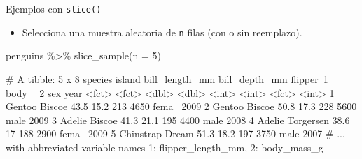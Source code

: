 \documentclass[
  ignorenonframetext,
  aspectratio=169]{beamer}
\newenvironment{Shaded}{\begin{snugshade}}{\end{snugshade}}
\newcommand{\AttributeTok}[1]{\textcolor[rgb]{0.77,0.63,0.00}{#1}}
\newcommand{\DecValTok}[1]{\textcolor[rgb]{0.00,0.00,0.81}{#1}}
\newcommand{\FunctionTok}[1]{\textcolor[rgb]{0.00,0.00,0.00}{#1}}
\newcommand{\NormalTok}[1]{#1}
\newcommand{\SpecialCharTok}[1]{\textcolor[rgb]{0.00,0.00,0.00}{#1}}
\providecommand{\tightlist}{%
  \setlength{\itemsep}{0pt}\setlength{\parskip}{0pt}}
\let\oldverbatim\verbatim
\let\endoldverbatim\endverbatim
\renewenvironment{verbatim}{\tiny\oldverbatim}{\endoldverbatim}
\begin{document}
\begin{frame}[fragile]{Ejemplos con \texttt{slice()}}
\protect\hypertarget{ejemplos-con-slice-2}{}
\begin{itemize}
\tightlist
\item
  Selecciona una muestra aleatoria de \texttt{n} filas (con o sin
  reemplazo).
\end{itemize}

\begin{Shaded}
\begin{Highlighting}[]
\NormalTok{penguins }\SpecialCharTok{\%\textgreater{}\%} 
  \FunctionTok{slice\_sample}\NormalTok{(}\AttributeTok{n =} \DecValTok{5}\NormalTok{)}
\end{Highlighting}
\end{Shaded}

\begin{verbatim}
# A tibble: 5 x 8
  species   island    bill_length_mm bill_depth_mm flipper~1 body_~2 sex    year
  <fct>     <fct>              <dbl>         <dbl>     <int>   <int> <fct> <int>
1 Gentoo    Biscoe              43.5          15.2       213    4650 fema~  2009
2 Gentoo    Biscoe              50.8          17.3       228    5600 male   2009
3 Adelie    Biscoe              41.3          21.1       195    4400 male   2008
4 Adelie    Torgersen           38.6          17         188    2900 fema~  2009
5 Chinstrap Dream               51.3          18.2       197    3750 male   2007
# ... with abbreviated variable names 1: flipper_length_mm, 2: body_mass_g
\end{verbatim}
\end{frame}
\end{document}
